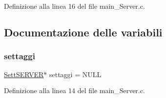Definizione alla linea 16 del file main\+\_\+\+Server.\+c.



\subsection{Documentazione delle variabili}
\mbox{\label{a00029_a9ea2d4cbc5355102c58960d512b000fc}} 
\subsubsection{\texorpdfstring{settaggi}{settaggi}}
{\footnotesize\ttfamily \mbox{\hyperlink{a00050_a2ae1b7622ac02fc56c93b1f3911fbd76}{Sett\+S\+E\+R\+V\+ER}}$\ast$ settaggi = N\+U\+LL}



Definizione alla linea 14 del file main\+\_\+\+Server.\+c.

